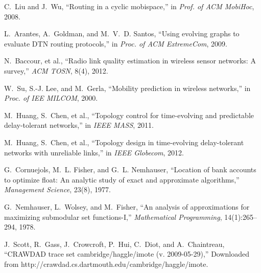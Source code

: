 \documentclass[10pt,conference,compsocconf,letterpaper]{IEEEtran}
\begin{document}
\begin{thebibliography}{10}
C.~Liu and J.~Wu, ``Routing in a cyclic mobispace,'' in \emph{Prof. of ACM MobiHoc}, 2008.

L.~Arantes, A.~Goldman, and M.~V.~D. Santos, ``Using evolving graphs to
  evaluate DTN routing protocols,'' in \emph{Proc. of ACM ExtremeCom}, 2009.

N.~Baccour, et al., ``Radio link quality estimation in wireless sensor networks: A
  survey,'' \emph{ACM TOSN}, 8(4), 2012.

W.~Su, S.-J. Lee, and M.~Gerla, ``Mobility prediction in wireless networks,''
  in \emph{Proc. of IEE MILCOM}, 2000.

M.~Huang, S.~Chen, et al., ``Topology control for
  time-evolving and predictable delay-tolerant networks,'' in \emph{IEEE
MASS},
  2011.

M.~Huang, S.~Chen, et al., ``Topology design in time-evolving
  delay-tolerant networks with unreliable links,'' in \emph{IEEE Globecom}, 2012.

G.~Cornuejols, M.~L. Fisher, and G.~L. Nemhauser, ``{Location of bank accounts
  to optimize float: An analytic study of exact and approximate algorithms},''
  \emph{Management Science}, 23(8), 1977.

G.~Nemhauser, L.~Wolsey, and M.~Fisher, ``An
  analysis of approximations for maximizing submodular set functions-I,''
  \emph{Mathematical Programming}, 14(1):265--294, 1978.

J.~Scott, R.~Gass, J.~Crowcroft, P.~Hui, C.~Diot, and A.~Chaintreau,
  ``{CRAWDAD} trace set cambridge/haggle/imote (v. 2009-05-29),'' Downloaded
  from http://crawdad.cs.dartmouth.edu/cambridge/haggle/imote.


\end{thebibliography}
\end{document}
